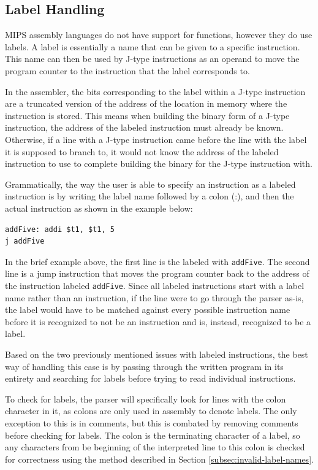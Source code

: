 \documentclass[
    paper=letter,
    parskip=half,
    fontsize=12pt,
    titlepage=firstiscover,
    toc=bibliography,
    numbers=endperiod
]{scrartcl}
\begin{document}
\subsection{Label Handling}

MIPS assembly languages do not have support for functions, however they
do use labels. A label is essentially a name that can be given to a
specific instruction. This name can then be used by J-type instructions
as an operand to move the program counter to the instruction that the
label corresponds to.

In the assembler, the bits corresponding to the label within a J-type
instruction are a truncated version of the address of the location in
memory where the instruction is stored. This means when building the
binary form of a J-type instruction, the address of the labeled
instruction must already be known. Otherwise, if a line with a J-type
instruction came before the line with the label it is supposed to branch
to, it would not know the address of the labeled instruction to use to
complete building the binary for the J-type instruction with.

Grammatically, the way the user is able to specify an instruction as a
labeled instruction is by writing the label name followed by a colon
(:), and then the actual instruction as shown in the example below:

\begin{verbatim}
addFive: addi $t1, $t1, 5
j addFive
\end{verbatim}

In the brief example above, the first line is the labeled with
\texttt{addFive}. The second line is a jump instruction that moves the
program counter back to the address of the instruction labeled
\texttt{addFive}. Since all labeled instructions start with a label name
rather than an instruction, if the line were to go through the parser
as-is, the label would have to be matched against every possible
instruction name before it is recognized to not be an instruction and
is, instead, recognized to be a label.

Based on the two previously mentioned issues with labeled instructions,
the best way of handling this case is by passing through the written
program in its entirety and searching for labels before trying to read
individual instructions.

To check for labels, the parser will specifically look for lines with
the colon character in it, as colons are only used in assembly to denote
labels. The only exception to this is in comments, but this is combated
by removing comments before checking for labels. The colon is the
terminating character of a label, so any characters from be beginning of
the interpreted line to this colon is checked for correctness using the
method described in Section \ref{subsec:invalid-label-names}.
\end{document}
